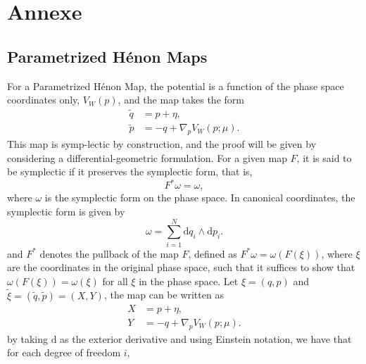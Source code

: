 \documentclass[11pt,a4paper]{article}
\begin{document}
\begin{sloppypar}
\newpage
\nocite{*}
\printbibliography %

%
% 





\newpage
\appendix %

\section{Annexe}
\label{Annexe}

\subsection{Parametrized H\'enon Maps}
For a Parametrized H\'enon Map, the potential is a function of the phase space coordinates only, $V_W(p)$, and the map takes the form
\begin{equation}
\begin{aligned}
\tilde q &= p + \eta,\\
\tilde p &= -q + \nabla_p V_W(p;\mu).
\end{aligned}
\end{equation}
This map is symp-lectic by construction, and the proof will be given by considering a differential-geometric formulation. For a given map $F$, it is said to be symplectic if it preserves the symplectic form, that is,
\begin{equation*}
F^* \omega = \omega,
\end{equation*}
where $\omega$ is the symplectic form on the phase space. In canonical coordinates, the symplectic form is given by
\begin{equation}
\omega = \sum_{i=1}^N \mathrm{d}q_i \wedge \mathrm{d}p_i.
\end{equation}
and $F^*$ denotes the pullback of the map $F$, defined as $F^* \omega = \omega(F(\xi))$, where $\xi$ are the coordinates in the original phase space, such that it suffices to show that $\omega(F(\xi)) = \omega(\xi)$ for all $\xi$ in the phase space.
Let $\xi=(q,p)$ and $\tilde \xi = (\tilde q,\tilde p) = (X,Y)$, the map can be written as 
\begin{equation}
\begin{aligned}
X &= p + \eta,\\
Y &= -q + \nabla_p V_W(p;\mu).
\end{aligned}
\end{equation}
by taking $\mathrm{d}$ as the exterior derivative and using Einstein notation, we have that for each degree of freedom $i$,

\end{sloppypar}
\end{document}

